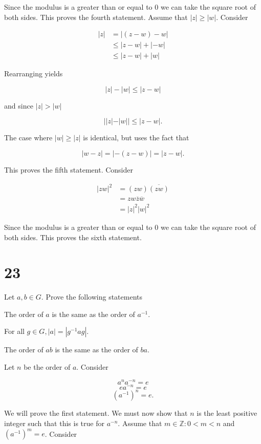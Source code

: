 \documentclass[a4paper]{article}
\begin{document}
Since the modulus is a greater than or equal to 0 we can take the square root of both sides. This proves the fourth statement. Assume that $|z| \geq |w|$. Consider

\begin{align*}
|z| &= |(z-w) - w| \\
 &\leq |z-w| + |-w| \\
 & \leq |z-w| + |w|
\end{align*}

Rearranging yields

$$ |z| - |w| \leq |z-w|$$

and since $|z| > |w|$ 

$$ ||z| - |w|| \leq |z-w|.$$

The case where $|w| \geq |z|$ is identical, but uses the fact that

$$|w - z| = |-(z-w)| = |z-w|.$$

This proves the fifth statement. Consider

\begin{align*}
|zw|^2 &= (zw)\overline{(zw)} \\
&= zw \overline{z} \overline{w} \\
&= |z|^2 |w|^2
\end{align*}

Since the modulus is a greater than or equal to 0 we can take the square root of both sides. This proves the sixth statement.




\section*{23}

Let $a,b \in G$. Prove the following statements

The order of $a$ is the same as the order of $a^{-1}$.

For all $g \in G, |a| = |g^{-1} a g|.$

The order of $ab$ is the same as the order of $ba$.

\vspace{\baselineskip}

Let $n$ be the order of $a$. Consider

$$a^n a^{-n} = e$$
$$e a^{-n} = e$$
$$(a^{-1})^{n} = e.$$

We will prove the first statement. We must now show that $n$ is the least positive integer such that this is true for $a^{-n}$. Assume that $m \in \mathbb{Z} : 0 < m < n$ and  $(a^{-1})^{m} = e$. Consider
\end{document}
